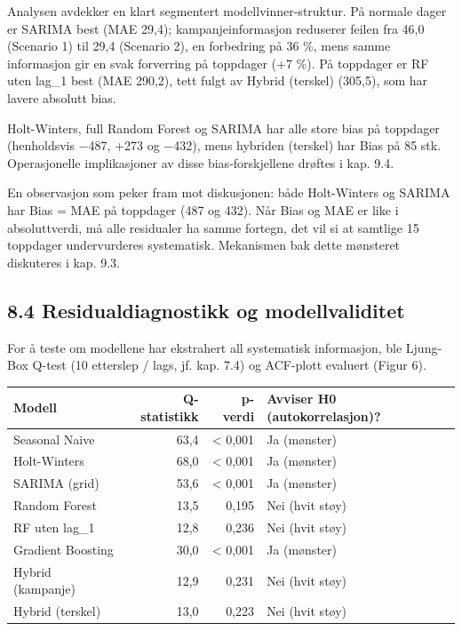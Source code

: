 \documentclass[
  norsk,
  11pt,
  a4paper,
]{article}
\newcounter{none} %
\begin{document}
Analysen avdekker en klart segmentert modellvinner-struktur. På normale
dager er SARIMA best (MAE 29,4); kampanjeinformasjon reduserer feilen
fra 46,0 (Scenario 1) til 29,4 (Scenario 2), en forbedring på 36 \%,
mens samme informasjon gir en svak forverring på toppdager (+7 \%). På
toppdager er RF uten lag\_1 best (MAE 290,2), tett fulgt av Hybrid
(terskel) (305,5), som har lavere absolutt bias.

Holt-Winters, full Random Forest og SARIMA har alle store bias på
toppdager (henholdsvis −487, +273 og −432), mens hybriden (terskel) har
\textbar Bias\textbar{} på 85 stk. Operasjonelle implikasjoner av disse
bias-forskjellene drøftes i kap. 9.4.

En observasjon som peker fram mot diskusjonen: både Holt-Winters og
SARIMA har \textbar Bias\textbar{} = MAE på toppdager (487 og 432). Når
Bias og MAE er like i absoluttverdi, må alle residualer ha samme
fortegn, det vil si at samtlige 15 toppdager undervurderes systematisk.
Mekanismen bak dette mønsteret diskuteres i kap. 9.3.

\subsection{8.4 Residualdiagnostikk og
modellvaliditet}\label{residualdiagnostikk-og-modellvaliditet}

For å teste om modellene har ekstrahert all systematisk informasjon, ble
Ljung-Box Q-test (10 etterslep / lags, jf. kap. 7.4) og ACF-plott
evaluert (Figur 6).

{\def\LTcaptype{none} %
\begin{longtable}[]{@{}lrrl@{}}
\toprule\noalign{}
Modell & Q-statistikk & p-verdi & Avviser H0 (autokorrelasjon)? \\
\midrule\noalign{}
\endhead
\bottomrule\noalign{}
\endlastfoot
Seasonal Naive & 63,4 & \textless{} 0,001 & Ja (mønster) \\
Holt-Winters & 68,0 & \textless{} 0,001 & Ja (mønster) \\
SARIMA (grid) & 53,6 & \textless{} 0,001 & Ja (mønster) \\
Random Forest & 13,5 & 0,195 & Nei (hvit støy) \\
RF uten lag\_1 & 12,8 & 0,236 & Nei (hvit støy) \\
Gradient Boosting & 30,0 & \textless{} 0,001 & Ja (mønster) \\
Hybrid (kampanje) & 12,9 & 0,231 & Nei (hvit støy) \\
Hybrid (terskel) & 13,0 & 0,223 & Nei (hvit støy) \\
\end{longtable}
}
\end{document}

